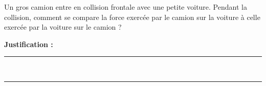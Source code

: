 Un gros camion entre en collision frontale avec une petite voiture. Pendant la collision, comment se compare la force exercée par le camion sur la voiture à celle exercée par la voiture sur le camion ?

\choices

\noindent\textbf{Justification :} \hrulefill \\[2.5ex]
\rule{\linewidth}{0.4pt} \\[2.5ex]
\rule{\linewidth}{0.4pt}
\vfill
